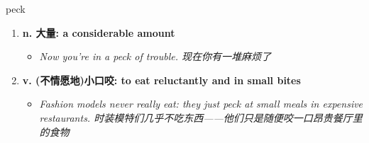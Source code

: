 
\begin{frame}
{\huge peck}
\begin{center}
\begin{enumerate}\Large
  \item \textbf{n. 大量: a considerable amount}
  \begin{itemize}
    \item \em{\Large{Now you're in a peck of trouble. 现在你有一堆麻烦了}}
  \end{itemize}
  \item \textbf{v. (不情愿地)小口咬: to eat reluctantly and in small bites}
  \begin{itemize}
    \item \em{\Large{Fashion models never really eat: they just peck at small meals in expensive restaurants. 时装模特们几乎不吃东西——他们只是随便咬一口昂贵餐厅里的食物}}
  \end{itemize}
\end{enumerate}
\end{center}
\end{frame}
